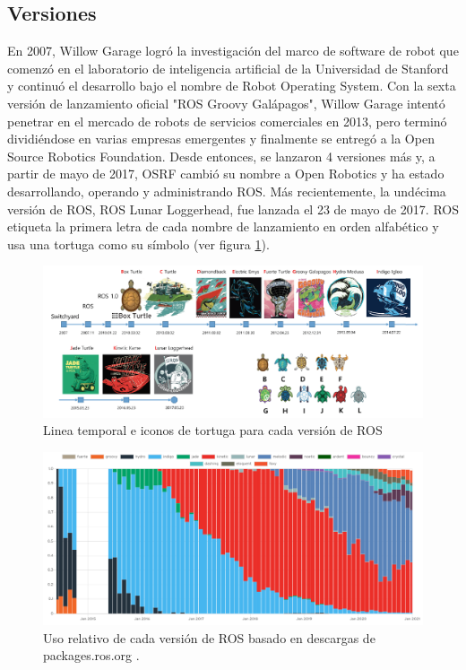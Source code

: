         \newpage

    \subsection{Versiones}
            En 2007, Willow Garage logró la investigación del marco de software de robot que comenzó en el laboratorio de inteligencia artificial de la Universidad de Stanford y continuó el desarrollo bajo el nombre de Robot Operating System. Con la sexta versión de lanzamiento oficial "ROS Groovy Galápagos", Willow Garage intentó penetrar en el mercado de robots de servicios comerciales en 2013, pero terminó dividiéndose en varias empresas emergentes y finalmente se entregó a la Open Source Robotics Foundation. Desde entonces, se lanzaron 4 versiones más y, a partir de mayo de 2017, OSRF cambió su nombre a Open Robotics y ha estado desarrollando, operando y administrando ROS. Más recientemente, la undécima versión de ROS, ROS Lunar Loggerhead, fue lanzada el 23 de mayo de 2017. ROS etiqueta la primera letra de cada nombre de lanzamiento en orden alfabético y usa una tortuga como su símbolo (ver figura \ref{f:Cap3-5_estadisticas_10}).
            
            \begin{figure}[htb]
            \centering
            \includegraphics[width=0.94\linewidth]{Main/Chapter3/Images3/ver_ros_1.png}
            \caption{Linea temporal e iconos de tortuga para cada versión de ROS \cite{ROS_BOOK_1}}
            \label{f:Cap3-5_estadisticas_10}
            \end{figure} 
    
            \begin{figure}[htb]
            \centering
            \includegraphics[width=0.94\linewidth]{Main/Chapter3/Images3/ver_ros_2.png}
            \caption{Uso relativo de cada versión de ROS basado en descargas de packages.ros.org \cite{rosmetrics}.}            \label{f:Cap3-5_estadisticas_11}
            \end{figure} 
    
